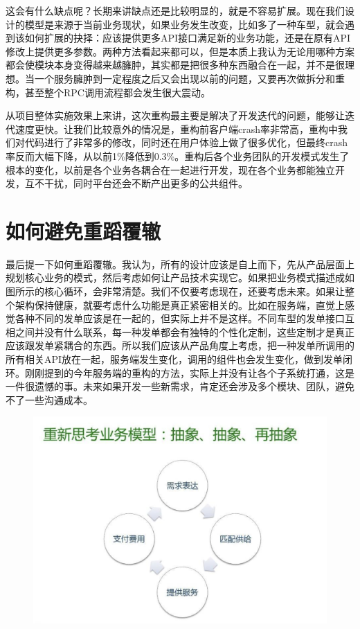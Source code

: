 \documentclass[12pt]{article}
\begin{document}
这会有什么缺点呢？长期来讲缺点还是比较明显的，就是不容易扩展。现在我们设计的模型是来源于当前业务现状，如果业务发生改变，比如多了一种车型，就会遇到该如何扩展的抉择：应该提供更多API接口满足新的业务功能，还是在原有API修改上提供更多参数。两种方法看起来都可以，但是本质上我认为无论用哪种方案都会使模块本身变得越来越臃肿，其实都是把很多种东西融合在一起，并不是很理想。当一个服务臃肿到一定程度之后又会出现以前的问题，又要再次做拆分和重构，甚至整个RPC调用流程都会发生很大震动。

从项目整体实施效果上来讲，这次重构最主要是解决了开发迭代的问题，能够让迭代速度更快。让我们比较意外的情况是，重构前客户端crash率非常高，重构中我们对代码进行了非常多的修改，同时还在用户体验上做了很多优化，但最终crash率反而大幅下降，从以前1\%降低到0.3\%。重构后各个业务团队的开发模式发生了根本的变化，以前是各个业务各耦合在一起进行开发，现在各个业务都能独立开发，互不干扰，同时平台还会不断产出更多的公共组件。

\section{如何避免重蹈覆辙}
最后提一下如何重蹈覆辙。我认为，所有的设计应该是自上而下，先从产品层面上规划核心业务的模式，然后考虑如何让产品技术实现它。如果把业务模式描述成如图所示的核心循环，会非常清楚。我们不仅要考虑现在，还要考虑未来。如果让整个架构保持健康，就要考虑什么功能是真正紧密相关的。比如在服务端，直觉上感觉各种不同的发单应该是在一起的，但实际上并不是这样。不同车型的发单接口互相之间并没有什么联系，每一种发单都会有独特的个性化定制，这些定制才是真正应该跟发单紧耦合的东西。所以我们应该从产品角度上考虑，把一种发单所调用的所有相关API放在一起，服务端发生变化，调用的组件也会发生变化，做到发单闭环。刚刚提到的今年服务端的重构的方法，实际上并没有让各个子系统打通，这是一件很遗憾的事。未来如果开发一些新需求，肯定还会涉及多个模块、团队，避免不了一些沟通成本。

\begin{figure}[H]
    \centering
    \includegraphics[width=1\textwidth]{fig/DIDI_Reconstruction_21.png}
\end{figure}
\end{document}
